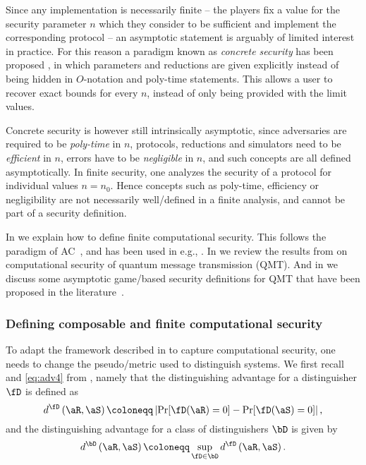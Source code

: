 Since any implementation is necessarily finite \--- the players fix a
value for the security parameter $n$ which they consider to be
sufficient and implement the corresponding protocol \--- an asymptotic
statement is arguably of limited interest in practice. For this reason
a paradigm known as \emph{concrete security} has been proposed
\cite{BDJR97}, in which parameters and reductions are given
explicitly instead of being hidden in $O$-notation and poly-time
statements. This allows a user to recover exact bounds for every $n$,
instead of only being provided with the limit values.

Concrete security is however still intrinsically asymptotic, since
adversaries are required to be \emph{poly-time} in $n$, protocols,
reductions and simulators need to be \emph{efficient} in $n$, errors
have to be \emph{negligible} in $n$, and such concepts are all defined
asymptotically. In finite security, one analyzes the security of a
protocol for individual values $n = n_0$. Hence concepts such as
poly-time, efficiency or negligibility are not necessarily
well\-/defined in a finite analysis, and cannot be part of a security
definition.

In  we explain how to define finite
computational security. This follows the paradigm of
AC~\cite{MR11,Mau12,MR16}, and has been used in e.g.,
\textcite{MRT12,CMT13,BMPZ19}. In  we
review the results from \textcite{BMPZ19} on computational security of
quantum message transmission (QMT). And in
 we discuss some asymptotic
game\-/based security definitions for QMT that have been proposed in the
literature~\cite{AGM18}.


\subsubsection{Defining composable and finite computational security}
\label{sec:computational.def}

To adapt the framework described in  to capture
computational security, one needs to change the pseudo\-/metric used
to distinguish systems. We first recall  and
\eqref{eq:adv4} from , namely that the
distinguishing advantage for a distinguisher $\fD$ is defined as
  \begin{equation}
  \label{eq:adv2.bis} 
    d^{\fD}\left(\aR,\aS\right) \coloneqq \left| \Pr[\fD(\aR) = 0] - \Pr[\fD(\aS) = 0] \right|,
  \end{equation}
and the distinguishing advantage for a class of distinguishers $\bD$ is
given by
  \begin{equation}
  \label{eq:adv4.bis} 
  d^{\bD}\left(\aR,\aS\right)  \coloneqq \sup_{\fD \in \bD} d^{\fD}\left(\aR,\aS\right).
\end{equation}


